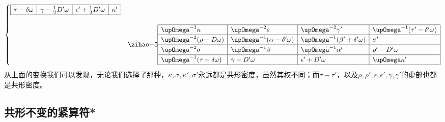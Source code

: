 \begin{equation*}
\begin{cases}
\begin{array}{|l|l|l|l|}
			\hline
			\tau -\delta \omega  & \gamma -\frac{1}{2} D'\omega  & \epsilon '+\frac{1}{2} D'\omega  & \kappa '\\
			\hline
		\end{array}\\ \\
		& {\small\begin{array}{|l|l|l|l|}
			\hline
			\upOmega^{-3} \kappa  & \upOmega^{-2} \epsilon  & \upOmega^{-2} \gamma ' & \upOmega^{-1}( \tau '-\delta '\omega )\\
			\hline
			\upOmega^{-2} (\rho -D\omega ) & \upOmega^{-1}( \alpha -\delta '\omega ) & \upOmega^{-1}( \beta '+\delta '\omega ) & \sigma '\\
			\hline
			\upOmega^{-2} \sigma  & \upOmega^{-1} \beta  & \upOmega^{-1} \alpha ' & \rho '-D'\omega \\
			\hline
			\upOmega^{-1} (\tau -\delta \omega ) & \gamma -D'\omega  & \epsilon '+D'\omega  & \upOmega\kappa '\\
			\hline
		\end{array}}
	\end{cases}
\end{equation*}
从上面的变换我们可以发现，无论我们选择了那种，$\kappa ,\sigma ,\kappa ',\sigma '$永远都是共形密度，虽然其权不同；而$\tau -\overline{\tau } '$，以及$\rho ,\rho ',\epsilon ,\epsilon ',\gamma ,\gamma '$的虚部也都是共形密度。


\subsection{共形不变的紧算符*}

